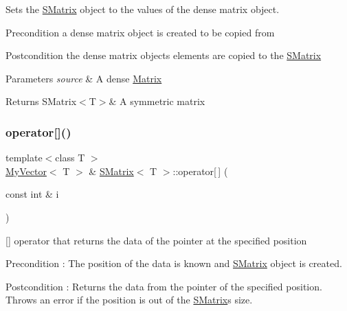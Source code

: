 Sets the \mbox{\hyperlink{class_s_matrix}{S\+Matrix}} object to the values of the dense matrix object. 

\begin{DoxyPrecond}{Precondition}
a dense matrix object is created to be copied from 
\end{DoxyPrecond}
\begin{DoxyPostcond}{Postcondition}
the dense matrix object\textquotesingle{}s elements are copied to the \mbox{\hyperlink{class_s_matrix}{S\+Matrix}}
\end{DoxyPostcond}

\begin{DoxyParams}{Parameters}
{\em source} & A dense \mbox{\hyperlink{class_matrix}{Matrix}} \\
\hline
\end{DoxyParams}
\begin{DoxyReturn}{Returns}
S\+Matrix$<$\+T$>$\& A symmetric matrix 
\end{DoxyReturn}
\mbox{\label{class_s_matrix_ab2092e3019526cd318f80731d7a226b5}} 
\subsubsection{\texorpdfstring{operator[]()}{operator[]()}\hspace{0.1cm}{\footnotesize\ttfamily [1/2]}}
{\footnotesize\ttfamily template$<$class T $>$ \\
\mbox{\hyperlink{class_my_vector}{My\+Vector}}$<$ T $>$ \& \mbox{\hyperlink{class_s_matrix}{S\+Matrix}}$<$ T $>$\+::operator\mbox{[}$\,$\mbox{]} (\begin{DoxyParamCaption}\item[{const int \&}]{i }\end{DoxyParamCaption})\hspace{0.3cm}{\ttfamily [virtual]}}



\mbox{[}\mbox{]} operator that returns the data of the pointer at the specified position 

\begin{DoxyPrecond}{Precondition}
\+: The position of the data is known and \mbox{\hyperlink{class_s_matrix}{S\+Matrix}} object is created. 
\end{DoxyPrecond}
\begin{DoxyPostcond}{Postcondition}
\+: Returns the data from the pointer of the specified position. Throws an error if the position is out of the \mbox{\hyperlink{class_s_matrix}{S\+Matrix}}\textquotesingle{}s size. 
\end{DoxyPostcond}

